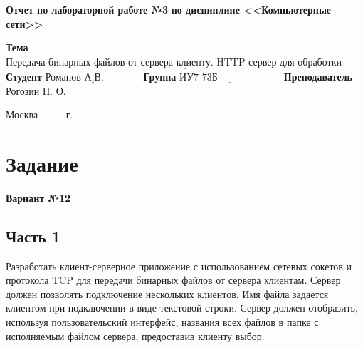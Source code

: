 \documentclass[12pt]{report}
\begin{document}
\begin{titlepage}
		\begin{center}
			\noindent\begin{minipage}{1.1\textwidth}\centering
				\Large\textbf{  Отчет по лабораторной работе №3}\newline
				\textbf{по дисциплине <<Компьютерные сети>>}\newline\newline\newline
			\end{minipage}
		\end{center}
		
		\noindent\textbf{Тема} $\underline{\text{Передача бинарных файлов от сервера клиенту. HTTP-сервер для обработки GET-запросов.}}$\newline\newline
		\noindent\textbf{Студент} $\underline{\text{Романов А.В.~~~~~~~~~~~}}$\newline\newline
		\noindent\textbf{Группа} $\underline{\text{ИУ7-73Б~~~~~~~~~~~~~~~~~~~}}$\newline\newline
		\noindent\textbf{Преподаватель} $\underline{\text{Рогозин Н. О.}}$\newline\newline\newline
		
		\begin{center}
			\vfill
			Москва~---~\the\year
			~г.
		\end{center}
	\end{titlepage}


\section*{Задание}

\textbf{Вариант №12}

\subsection*{Часть 1}

Разработать клиент-серверное приложение с использованием сетевых сокетов и протокола TCP для передачи бинарных файлов от сервера клиентам. Сервер должен позволять подключение нескольких клиентов. Имя файла задается клиентом при подключении в виде текстовой строки. Сервер должен отобразить, используя пользовательский интерфейс, названия всех файлов в папке с исполняемым файлом сервера, предоставив клиенту выбор.
\end{document}
